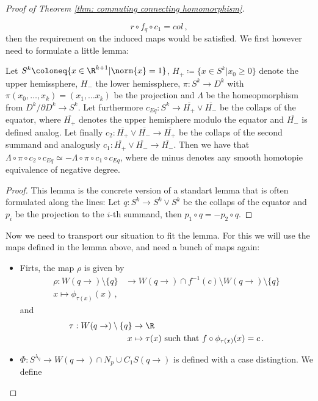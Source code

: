 \begin{proof}[Proof of Theorem \ref{thm: commuting connecting homomorphism}]
\begin{itemize}
			\begin{equation*}
				r\circ f_q\circ c_1=col\,, 
			\end{equation*}then the requirement on the induced maps would be satisfied. We first however need to formulate a little lemma:
			\begin{lemma}
				Let $S^k\coloneq \{x\in \R^{k+1}|\norm{x}=1\}$, $H_+\coloneq\{x\in S^k|x_0\geq 0\}$ denote the upper hemissphere, $H_-$ the lower hemissphere,  $\pi:S^k \to D^k$ with $\pi(x_0,\dots,x_{k})=(x_1,\dots x_k)$ be the projection and $\Lambda$ be the homeopmorphism from $D^k\big/\partial D^k \to S^k$. Let furthermore $c_{Eq}:S^k\to \overline{H_+}\vee \overline{H_-}$ be the collaps of the equator, where $\overline{H_+}$ denotes the upper hemisphere modulo the equator and $\overline{H_-}$ is defined analog. Let finally $c_2: \overline{H_+}\vee \overline{H_-} \to \overline{H_+}$ be the collaps of the second summand and analogusly $c_1:  \overline{H_+}\vee \overline{H_-} \to \overline{H_-}$. Then we have that $\Lambda\circ \pi\circ c_2\circ c_{Eq}\simeq -\Lambda\circ \pi\circ c_1\circ c_{Eq}$, where de minus denotes any smooth homotopie equivalence of negative degree. 
			\end{lemma}
			\begin{proof}
				This lemma is the concrete version of a standart lemma that is often formulated along the lines: Let $q:S^k\to S^k\vee S^k$ be the collaps of the equator and $p_i$ be the projection to the $i$-th summand, then $p_1\circ q=-p_2\circ q$.  
			\end{proof}
			Now we need to transport our situation to fit the lemma. For this we will use the maps defined in the lemma above, and need a bunch of maps again: 
			\begin{itemize}
				\item Firts, the map $\rho$ is given by 
				\begin{align*}
					\rho: W(q\to)\setminus \{q\}&\to W(q\to)\cap f^{-1}(c)\setminus W(q\to)\setminus \{q\}\\
					x\mapsto \phi_{\tau(x)}(x)\,,
				\end{align*} and 
				\begin{align*}
					\tau: W(q\to)\setminus \{q\} &\to \R\\
					x                  &\mapsto \tau(x) \text{ such that }f\circ \phi_{\tau(x)}(x) =c \, .
				\end{align*}
				\item $\Phi:S^{\lambda_q}\to W(q\to) \cap N_p\cup C_1S(q\to)$ is defined with a case distingtion. We define 

\end{itemize}
\end{itemize}
\end{proof}
